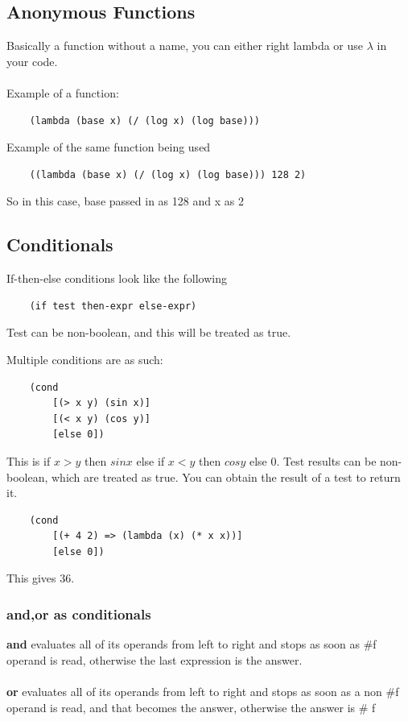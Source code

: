 \documentclass[12pt]{article}
\begin{document}
\subsection{Anonymous Functions}

Basically a function without a name, you can either right lambda or use $\lambda$ in your code.\\
\\
Example of a function:
\begin{lstlisting}
    (lambda (base x) (/ (log x) (log base)))
\end{lstlisting}
Example of the same function being used
\begin{lstlisting}
    ((lambda (base x) (/ (log x) (log base))) 128 2)
\end{lstlisting}
So in this case, base passed in as 128 and x as 2

\subsection{Conditionals}

If-then-else conditions look like the following
\begin{lstlisting}
	(if test then-expr else-expr)
\end{lstlisting}
Test can be non-boolean, and this will be treated as true.

Multiple conditions are as such:
\begin{lstlisting}
	(cond
		[(> x y) (sin x)]
		[(< x y) (cos y)]
		[else 0])
\end{lstlisting}
This is if $x>y$ then $sinx$ else if $x < y$ then $cosy$ else 0. Test results can be non-boolean, which are treated as true. You can obtain the result of a test to return it.
\begin{lstlisting}
	(cond
		[(+ 4 2) => (lambda (x) (* x x))]
		[else 0])
\end{lstlisting}
This gives 36.

\subsubsection{and,or as conditionals}
\textbf{and} evaluates all of its operands from left to right and stops as soon as \#f operand is read, otherwise the last expression is the answer.\\
\\
\textbf{or} evaluates all of its operands from left to right and stops as soon as a non \#f operand is read, and that becomes the answer, otherwise the answer is \# f
\end{document}
